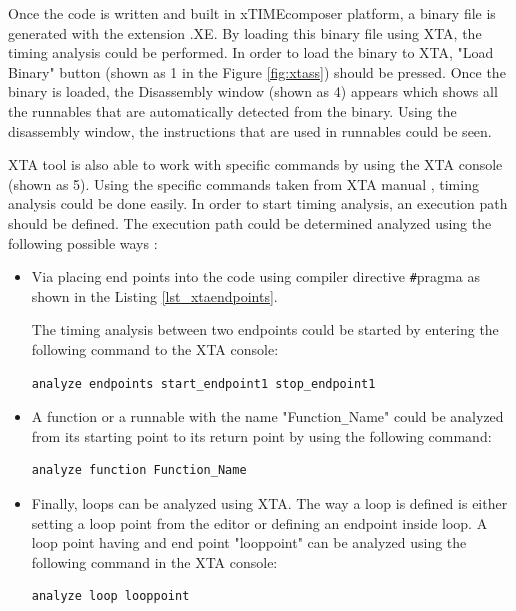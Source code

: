 Once the code is written and built in xTIMEcomposer platform, a binary file is generated with the extension .XE. By loading this binary file using XTA, the timing analysis could be performed. In order to load the binary to XTA, "Load Binary" button (shown as 1 in the Figure \ref{fig:xtass}) should be pressed. Once the binary is loaded, the Disassembly window (shown as 4) appears which shows all the runnables that are automatically detected from the binary. Using the disassembly window, the instructions that are used in runnables could be seen. 

XTA tool is also able to work with specific commands by using the XTA console (shown as 5). Using the specific commands taken from XTA manual \cite{xtamanual}, timing analysis could be done easily. In order to start timing analysis, an execution path should be defined. The execution path could be determined analyzed using the following possible ways \cite{xtamanual}:

\begin{itemize}
	\item Via placing end points into the code using compiler directive \texttt{\#}pragma as shown in the Listing \ref{lst_xtaendpoints}.
	
	The timing analysis between two endpoints could be started by entering the following command to the XTA console:
	\begin{lstlisting}[style=xc]
	analyze endpoints start_endpoint1 stop_endpoint1
	\end{lstlisting}
	\item A function or a runnable with the name "Function\texttt{\_}Name" could be analyzed from its starting point to its return point by using the following command:
	\begin{lstlisting}[style=xc]
	analyze function Function_Name
	\end{lstlisting}
	\item Finally, loops can be analyzed using XTA. The way a loop is defined is either setting a loop point from the editor or defining an endpoint inside loop. A loop point having and end point "looppoint" can be analyzed using the following command in the XTA console: \\
	\begin{lstlisting}[style=xc]
		analyze loop looppoint
	\end{lstlisting}
\end{itemize}

